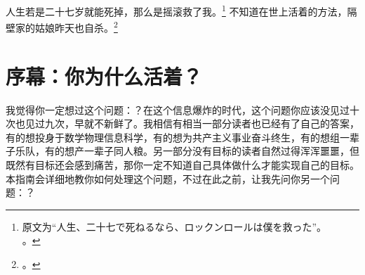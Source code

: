 

\begin{savequote}[250pt] %
    \fontsize{8pt}{8pt} %
    人生若是二十七岁就能死掉，那么是摇滚救了我。\footnote{原文为“人生、二十七で死ねるなら、ロックンロールは僕を救った”。\\\indent {}。}
    不知道在世上活着的方法，隔壁家的姑娘昨天也自杀。\footnote{\another{}。}
\end{savequote}
\chapter{序幕：你为什么活着？\label{chap:wedge}}




我觉得你一定想过这个问题：？在这个信息爆炸的时代，这个问题你应该没见过十次也见过九次，早就不新鲜了。我相信有相当一部分读者也已经有了自己的答案，有的想投身于数学物理信息科学，有的想为共产主义事业奋斗终生，有的想组一辈子乐队，有的想产一辈子同人粮。另一部分没有目标的读者自然过得浑浑噩噩，但既然有目标还会感到痛苦，那你一定不知道自己具体做什么才能实现自己的目标。本指南会详细地教你如何处理这个问题，不过在此之前，让我先问你另一个问题：？

